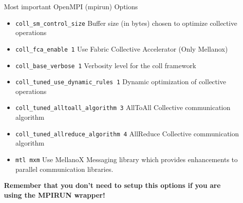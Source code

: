 \documentclass[final,t]{beamer}
\begin{document}
\begin{frame}[fragile]{}
\begin{columns}[t]
\begin{column}{.35\linewidth}
\begin{block}{Most important OpenMPI (mpirun) Options}
\begin{itemize}
\begin{itemize}
         \item \verb|coll_sm_control_size| Buffer size (in bytes) chosen to optimize collective operations
         \item \verb|coll_fca_enable 1| Use Fabric Collective Accelerator (Only Mellanox)
         \item \verb|coll_base_verbose 1| Verbosity level for the coll framework
         \item \verb|coll_tuned_use_dynamic_rules 1| Dynamic optimization of collective operations
         \item \verb|coll_tuned_alltoall_algorithm 3| AllToAll Collective communication algorithm 
         \item \verb|coll_tuned_allreduce_algorithm 4| AllReduce Collective communication algorithm
         \item \verb|mtl mxm| Use MellanoX Messaging library which provides enhancements to parallel communication libraries.
         \end{itemize}
        \end{itemize}
        \textbf{Remember that you don't need to setup this options if you are using the MPIRUN wrapper!}
      \end{block}




    \end{column}

    
    \begin{column}{.3\linewidth}
    

\end{column}
\end{columns}
\end{frame}
\end{document}
